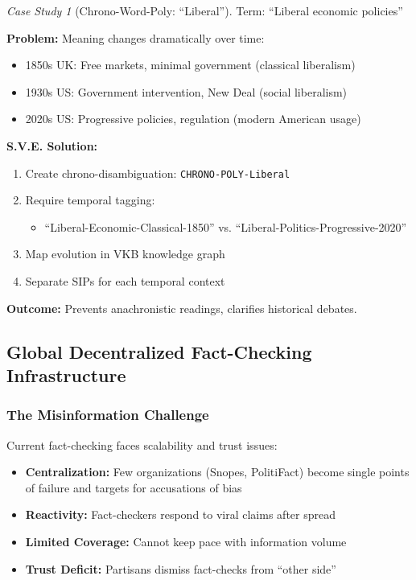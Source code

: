 \documentclass[11pt,a4paper]{article}
\theoremstyle{definition}
\theoremstyle{remark}
\newtheorem{casestudy}{Case Study}[section]
\newcommand{\VKB}{\textsc{VKB}}
\newcommand{\SIP}{\textsc{SIP}}
\begin{document}
\begin{casestudy}[Chrono-Word-Poly: ``Liberal'']
Term: ``Liberal economic policies''

\textbf{Problem:} Meaning changes dramatically over time:
\begin{itemize}
    \item 1850s UK: Free markets, minimal government (classical liberalism)
    \item 1930s US: Government intervention, New Deal (social liberalism)
    \item 2020s US: Progressive policies, regulation (modern American usage)
\end{itemize}

\textbf{S.V.E. Solution:}
\begin{enumerate}
    \item Create chrono-disambiguation: \texttt{CHRONO-POLY-Liberal}
    \item Require temporal tagging:
    \begin{itemize}
        \item ``Liberal-Economic-Classical-1850'' vs. ``Liberal-Politics-Progressive-2020''
    \end{itemize}
    \item Map evolution in \VKB{} knowledge graph
    \item Separate \SIP{}s for each temporal context
\end{enumerate}

\textbf{Outcome:} Prevents anachronistic readings, clarifies historical debates.
\end{casestudy}

\subsection{Global Decentralized Fact-Checking Infrastructure}

\subsubsection{The Misinformation Challenge}

Current fact-checking faces scalability and trust issues:
\begin{itemize}
    \item \textbf{Centralization:} Few organizations (Snopes, PolitiFact) become single points of failure and targets for accusations of bias
    \item \textbf{Reactivity:} Fact-checkers respond to viral claims after spread
    \item \textbf{Limited Coverage:} Cannot keep pace with information volume
    \item \textbf{Trust Deficit:} Partisans dismiss fact-checks from ``other side''
\end{itemize}
\end{document}
